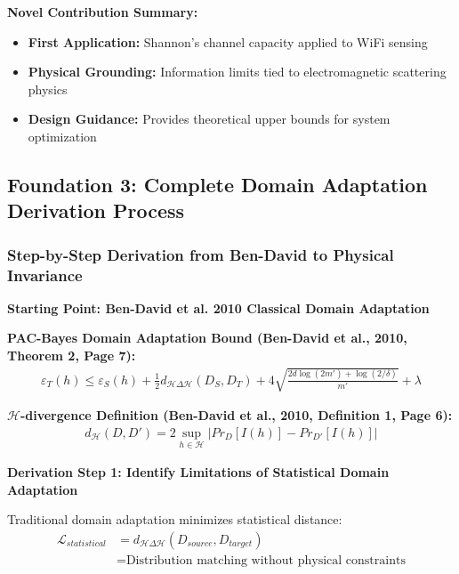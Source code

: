 \documentclass[12pt,a4paper]{article}
\begin{document}
\textbf{Novel Contribution Summary:}
\begin{itemize}
\item \textbf{First Application:} Shannon's channel capacity applied to WiFi sensing
\item \textbf{Physical Grounding:} Information limits tied to electromagnetic scattering physics
\item \textbf{Design Guidance:} Provides theoretical upper bounds for system optimization
\end{itemize}

\subsection{Foundation 3: Complete Domain Adaptation Derivation Process}

\subsubsection{Step-by-Step Derivation from Ben-David to Physical Invariance}

\textbf{Starting Point: Ben-David et al. 2010 Classical Domain Adaptation}

\textbf{PAC-Bayes Domain Adaptation Bound (Ben-David et al., 2010, Theorem 2, Page 7):}
\begin{align}
\varepsilon_T(h) \leq \varepsilon_S(h) + \frac{1}{2}d_{\mathcal{H}\Delta\mathcal{H}}(D_S,D_T) + 4\sqrt{\frac{2d\log(2m') + \log(2/\delta)}{m'}} + \lambda \label{eq:bendavid_original_bound}
\end{align}

\textbf{$\mathcal{H}$-divergence Definition (Ben-David et al., 2010, Definition 1, Page 6):}
\begin{align}
d_{\mathcal{H}}(D,D') = 2 \sup_{h \in \mathcal{H}} |Pr_{D}[I(h)] - Pr_{D'}[I(h)]| \label{eq:h_divergence_original}
\end{align}

\textbf{Derivation Step 1: Identify Limitations of Statistical Domain Adaptation}

Traditional domain adaptation minimizes statistical distance:
\begin{align}
\mathcal{L}_{statistical} &= d_{\mathcal{H}\Delta\mathcal{H}}(D_{source}, D_{target}) \label{eq:statistical_da_original}\\
&= \text{Distribution matching without physical constraints} \label{eq:statistical_da_limitation}
\end{align}
\end{document}
